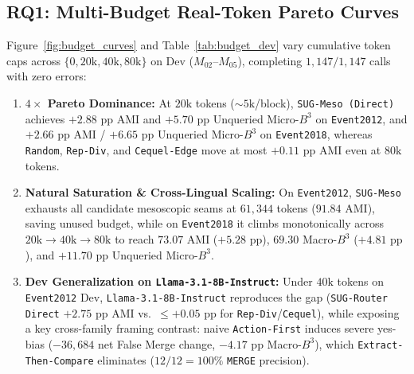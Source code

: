 \subsection{RQ1: Multi-Budget Real-Token Pareto Curves}
\label{sec:rq1}
Figure~\ref{fig:budget_curves} and Table~\ref{tab:budget_dev} vary cumulative token caps across $\{0, 20\text{k}, 40\text{k}, 80\text{k}\}$ on Dev ($M_{02}$--$M_{05}$), completing $1{,}147/1{,}147$ calls with zero errors:
\begin{enumerate}
    \item \textbf{$4\times$ Pareto Dominance:} At $20\text{k}$ tokens ($\sim 5\text{k}$/block), \texttt{SUG-Meso (Direct)} achieves $+2.88\text{ pp}$ AMI and $+5.70\text{ pp}$ Unqueried Micro-$B^3$ on \texttt{Event2012}, and $+2.66\text{ pp}$ AMI / $+6.65\text{ pp}$ Unqueried Micro-$B^3$ on \texttt{Event2018}, whereas \texttt{Random}, \texttt{Rep-Div}, and \texttt{Cequel-Edge} move at most $+0.11\text{ pp}$ AMI even at $80\text{k}$ tokens.
    \item \textbf{Natural Saturation \& Cross-Lingual Scaling:} On \texttt{Event2012}, \texttt{SUG-Meso} exhausts all candidate mesoscopic seams at $61{,}344$ tokens ($91.84$ AMI), saving unused budget, while on \texttt{Event2018} it climbs monotonically across $20\text{k} \to 40\text{k} \to 80\text{k}$ to reach $73.07$ AMI ($+5.28\text{ pp}$), $69.30$ Macro-$B^3$ ($+4.81\text{ pp}$), and $+11.70\text{ pp}$ Unqueried Micro-$B^3$.
    \item \textbf{Dev Generalization on \texttt{Llama-3.1-8B-Instruct}:} Under $40\text{k}$ tokens on \texttt{Event2012} Dev, \texttt{Llama-3.1-8B-Instruct} reproduces the gap (\texttt{SUG-Router Direct} $+2.75\text{ pp}$ AMI vs.\ $\le +0.05\text{ pp}$ for \texttt{Rep-Div}/\texttt{Cequel}), while exposing a key cross-family framing contrast: naive \texttt{Action-First} induces severe yes-bias ($-36{,}684$ net False Merge change, $-4.17\text{ pp}$ Macro-$B^3$), which \texttt{Extract-Then-Compare} eliminates ($12/12 = 100\%$ \texttt{MERGE} precision).
\end{enumerate}

